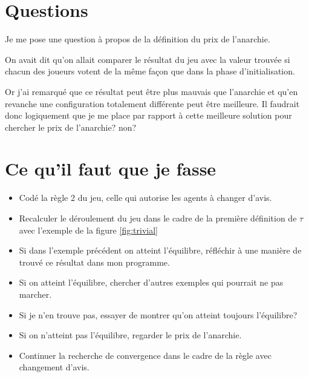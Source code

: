 \documentclass[12pt]{article}
\theoremstyle{defi}
\theoremstyle{not}
\theoremstyle{prob}
\begin{document}
  \section{Questions}
    Je me pose une question à propos de la définition du prix de l'anarchie.

    On avait dit qu'on allait comparer le résultat du jeu avec la valeur trouvée si chacun des joueurs votent de la même façon que dans la phase d'initialisation.

    Or j'ai remarqué que ce résultat peut être plus mauvais que l'anarchie et qu'en revanche une configuration totalement différente peut être meilleure. Il faudrait donc logiquement que je me place par rapport à cette meilleure solution pour chercher le prix de l'anarchie? non?


\color{black}
\section{Ce qu'il faut que je fasse}

\begin{itemize}
  \color{red}
  \item Codé la règle 2 du jeu, celle qui autorise les agents à changer d'avis.
  \item Recalculer le déroulement du jeu dans le cadre de la première définition de $\tau$ avec l'exemple de la figure \ref{fig:trivial}
  \item Si dans l'exemple précédent on atteint l'équilibre, réfléchir à une manière de trouvé ce résultat dans mon programme.
  \item Si on atteint l'équilibre, chercher d'autres exemples qui pourrait ne pas marcher.
  \item Si je n'en trouve pas, essayer de montrer qu'on atteint toujours l'équilibre?
  \color{black}
  \item Si on n'atteint pas l'équilibre, regarder le prix de l'anarchie.
  \item Continuer la recherche de convergence dans le cadre de la règle avec changement d'avis.
\end{itemize}
\end{document}

